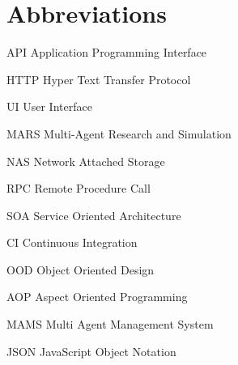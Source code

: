     \newcommand{\abbrlabel}[1]{\makebox[3cm][l]{\textbf{#1}\ }}
\newenvironment{abbreviations}{\begin{list}{}{\renewcommand{\makelabel}{\abbrlabel}}}{\end{list}}
%

\newpage
\chapter*{Abbreviations}
\begin{abbreviations}
\item[API] Application Programming Interface
\item[HTTP] Hyper Text Transfer Protocol
\item[UI] User Interface
\item[MARS] Multi-Agent Research and Simulation
\item[NAS] Network Attached Storage
\item[RPC] Remote Procedure Call
\item[SOA] Service Oriented Architecture
\item[CI] Continuous Integration
\item[OOD] Object Oriented Design
\item[AOP] Aspect Oriented Programming
\item[MAMS] Multi Agent Management System
\item[JSON] JavaScript Object Notation
\end{abbreviations}
%